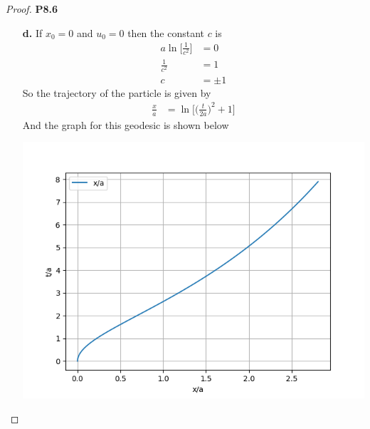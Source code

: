 \documentclass[11pt]{article}
\theoremstyle{definition}
\begin{document}
\begin{proof}{\textbf{P8.6}}
\begin{itemize}
        \item [\textbf{d.}] If $x_0 = 0$ and $u_0 = 0$ then the constant $c$
        is
        \begin{align*}
            a\ln\bigg[\frac{1}{c^2}\bigg] &= 0\\
            \frac{1}{c^2} &= 1\\
            c &= \pm 1
        \end{align*}
        So the trajectory of the particle is given by
        \begin{align*}
            \frac{x}{a} &= \ln\bigg[\bigg(\frac{t}{2a}\bigg)^2 + 1\bigg]
        \end{align*}
\cleardoublepage
        And the graph for this geodesic is shown below
        \begin{center}
            \includegraphics[scale=0.8]{ch8-6.png}
        \end{center}


\end{itemize}
\end{proof}
\end{document}
